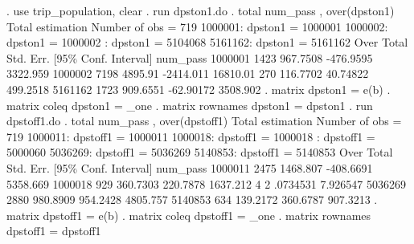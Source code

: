 . use trip_population, clear
{\smallskip}
. run dpston1.do
{\smallskip}
. total num_pass , over(dpston1)
{\smallskip}
Total estimation                  Number of obs   =        719
{\smallskip}
      1000001: dpston1 = 1000001
      1000002: dpston1 = 1000002
\smallskip
\oom
{}: dpston1 = 5104068
      5161162: dpston1 = 5161162
{\smallskip}
        Over {\VBAR}      Total   Std. Err.     [95\% Conf. Interval]
num_pass     {\VBAR}
     1000001 {\VBAR}       1423   967.7508     -476.9595    3322.959
     1000002 {\VBAR}       7198    4895.91     -2414.011    16810.01
\smallskip
\oom
{} {\VBAR}        270   116.7702      40.74822    499.2518
     5161162 {\VBAR}       1723   909.6551     -62.90172    3508.902
{\smallskip}
. matrix dpston1 = e(b)
{\smallskip}
. matrix coleq dpston1 = _one
{\smallskip}
. matrix rownames dpston1 = dpston1
{\smallskip}
. run dpstoff1.do
{\smallskip}
. total num_pass , over(dpstoff1)
{\smallskip}
Total estimation                  Number of obs   =        719
{\smallskip}
      1000011: dpstoff1 = 1000011
      1000018: dpstoff1 = 1000018
\smallskip
\oom
{}: dpstoff1 = 5000060
      5036269: dpstoff1 = 5036269
      5140853: dpstoff1 = 5140853
{\smallskip}
        Over {\VBAR}      Total   Std. Err.     [95\% Conf. Interval]
num_pass     {\VBAR}
     1000011 {\VBAR}       2475   1468.807     -408.6691    5358.669
     1000018 {\VBAR}        929   360.7303      220.7878    1637.212
\smallskip
\oom
{} {\VBAR}          4          2      .0734531    7.926547
     5036269 {\VBAR}       2880   980.8909      954.2428    4805.757
     5140853 {\VBAR}        634   139.2172      360.6787    907.3213
{\smallskip}
. matrix dpstoff1 = e(b)
{\smallskip}
. matrix coleq dpstoff1 = _one
{\smallskip}
. matrix rownames dpstoff1 = dpstoff1
{\smallskip}
